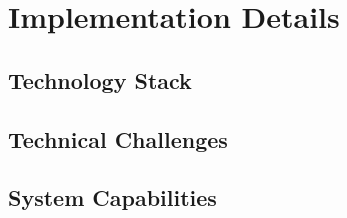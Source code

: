 \chapter{Implementation Details}
\label{ch:implementation}

\section{Technology Stack}

\section{Technical Challenges}

\section{System Capabilities}
